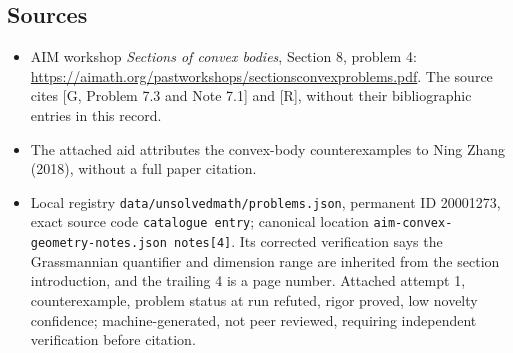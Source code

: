 \documentclass[11pt]{article}
\begin{document}
\subsection{Sources}
\begin{itemize}
\item AIM workshop \emph{Sections of convex bodies}, Section 8, problem 4: \url{https://aimath.org/pastworkshops/sectionsconvexproblems.pdf}. The source cites [G, Problem 7.3 and Note 7.1] and [R], without their bibliographic entries in this record.
\item The attached aid attributes the convex-body counterexamples to Ning Zhang (2018), without a full paper citation.
\item Local registry \texttt{data/unsolvedmath/problems.json}, permanent ID 20001273, exact source code \texttt{catalogue entry}; canonical location \texttt{aim-convex-geometry-notes.json notes[4]}. Its corrected verification says the Grassmannian quantifier and dimension range are inherited from the section introduction, and the trailing 4 is a page number. Attached attempt 1, counterexample, problem status at run refuted, rigor proved, low novelty confidence; machine-generated, not peer reviewed, requiring independent verification before citation.
\end{itemize}
\end{document}
